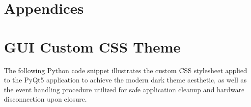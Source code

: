 \documentclass[12pt,a4paper]{article}
\begin{document}
\newpage



\newpage
\section*{Appendices}
\appendix

\section{GUI Custom CSS Theme}
\label{app:css_theme}

The following Python code snippet illustrates the custom CSS stylesheet applied to the PyQt5 application to achieve the modern dark theme aesthetic, as well as the event handling procedure utilized for safe application cleanup and hardware disconnection upon closure.
\end{document}
